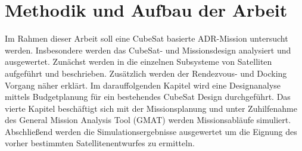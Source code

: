 	\section{Methodik und Aufbau der Arbeit}
Im Rahmen dieser Arbeit soll eine  CubeSat basierte ADR-Mission untersucht werden. Insbesondere werden das CubeSat- und Missionsdesign analysiert und ausgewertet. Zunächst werden in  die einzelnen Subsysteme von Satelliten aufgeführt und beschrieben. Zusätzlich werden der Rendezvous- und Docking Vorgang näher erklärt. Im darauffolgenden Kapitel wird eine Designanalyse mittels Budgetplanung für ein bestehendes CubeSat Design durchgeführt.  Das vierte Kapitel beschäftigt sich mit der Missionsplanung und unter Zuhilfenahme des General Mission Analysis Tool (GMAT) werden Missionsabläufe simuliert. Abschließend werden die Simulationsergebnisse ausgewertet um die Eignung des vorher bestimmten Satellitenentwurfes zu ermitteln.

